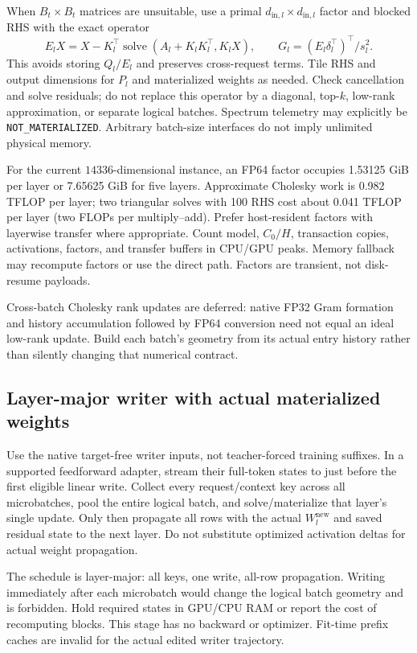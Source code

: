 \documentclass[11pt]{article}
\begin{document}
When $B_t\times B_t$ matrices are unsuitable, use a primal
$d_{\mathrm{in},l}\times d_{\mathrm{in},l}$ factor and blocked RHS with the
exact operator
\[
 E_lX=X-K_l^\top\operatorname{solve}
       (A_l+K_lK_l^\top,K_lX),\qquad
 G_l=(E_l\delta_l^\top)^\top/s_l^2.
\]
This avoids storing $Q_l/E_l$ and preserves cross-request terms. Tile RHS
and output dimensions for $P_l$ and materialized weights as needed. Check
cancellation and solve residuals; do not replace this operator by a
diagonal, top-$k$, low-rank approximation, or separate logical batches.
Spectrum telemetry may explicitly be \texttt{NOT\_MATERIALIZED}. Arbitrary
batch-size interfaces do not imply unlimited physical memory.

For the current $14336$-dimensional instance, an FP64 factor occupies
1.53125 GiB per layer or 7.65625 GiB for five layers. Approximate Cholesky
work is 0.982 TFLOP per layer; two triangular solves with 100 RHS cost about
0.041 TFLOP per layer (two FLOPs per multiply--add). Prefer host-resident
factors with layerwise transfer where appropriate. Count model, $C_0/H$,
transaction copies, activations, factors, and transfer buffers in CPU/GPU
peaks. Memory fallback may recompute factors or use the direct path.
Factors are transient, not disk-resume payloads.

Cross-batch Cholesky rank updates are deferred: native FP32 Gram formation
and history accumulation followed by FP64 conversion need not equal an
ideal low-rank update. Build each batch's geometry from its actual entry
history rather than silently changing that numerical contract.

\subsection{Layer-major writer with actual materialized weights}

Use the native target-free writer inputs, not teacher-forced training
suffixes. In a supported feedforward adapter, stream their full-token
states to just before the first eligible linear write. Collect every
request/context key across all microbatches, pool the entire logical batch,
and solve/materialize that layer's single update. Only then propagate all
rows with the actual $W_l^{\mathrm{new}}$ and saved residual state to the
next layer. Do not substitute optimized activation deltas for actual
weight propagation.

The schedule is layer-major: all keys, one write, all-row propagation.
Writing immediately after each microbatch would change the logical batch
geometry and is forbidden. Hold required states in GPU/CPU RAM or report
the cost of recomputing blocks. This stage has no backward or optimizer.
Fit-time prefix caches are invalid for the actual edited writer trajectory.
\end{document}
